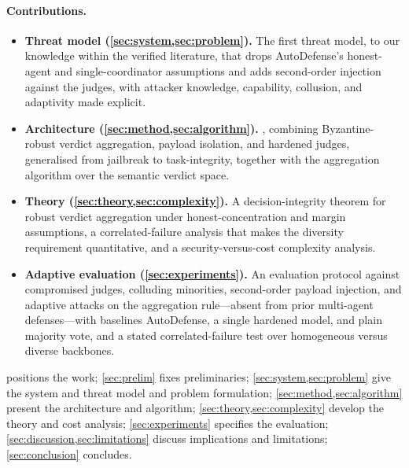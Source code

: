 \paragraph{Contributions.}
\begin{itemize}[leftmargin=1.4em,itemsep=2pt,topsep=2pt]
  \item \textbf{Threat model (\cref{sec:system,sec:problem}).} The first threat model,
        to our knowledge within the verified literature, that drops AutoDefense's
        honest-agent and single-coordinator assumptions and adds second-order injection
        against the judges, with attacker knowledge, capability, collusion, and adaptivity
        made explicit.
  \item \textbf{Architecture (\cref{sec:method,sec:algorithm}).} \Aegis, combining
        Byzantine-robust verdict aggregation, payload isolation, and hardened judges,
        generalised from jailbreak to task-integrity, together with the aggregation
        algorithm over the semantic verdict space.
  \item \textbf{Theory (\cref{sec:theory,sec:complexity}).} A decision-integrity theorem
        for robust verdict aggregation under honest-concentration and margin assumptions,
        a correlated-failure analysis that makes the diversity requirement quantitative,
        and a security-versus-cost complexity analysis.
  \item \textbf{Adaptive evaluation (\cref{sec:experiments}).} An evaluation protocol
        against compromised judges, colluding minorities, second-order payload injection,
        and adaptive attacks on the aggregation rule—absent from prior multi-agent
        defenses—with baselines AutoDefense, a single hardened model, and plain majority
        vote, and a stated correlated-failure test over homogeneous versus diverse
        backbones.
\end{itemize}

 positions the work; \cref{sec:prelim} fixes preliminaries;
\cref{sec:system,sec:problem} give the system and threat model and problem formulation;
\cref{sec:method,sec:algorithm} present the architecture and algorithm;
\cref{sec:theory,sec:complexity} develop the theory and cost analysis;
\cref{sec:experiments} specifies the evaluation; \cref{sec:discussion,sec:limitations}
discuss implications and limitations; \cref{sec:conclusion} concludes.
